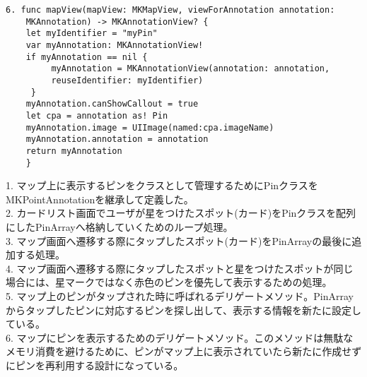\begin{description}
\begin{lstlisting}[basicstyle=\ttfamily\footnotesize, frame=single]
6. func mapView(mapView: MKMapView, viewForAnnotation annotation: 
    MKAnnotation) -> MKAnnotationView? {
    let myIdentifier = "myPin"
    var myAnnotation: MKAnnotationView!
    if myAnnotation == nil {
         myAnnotation = MKAnnotationView(annotation: annotation,
         reuseIdentifier: myIdentifier)
     }
    myAnnotation.canShowCallout = true
    let cpa = annotation as! Pin
    myAnnotation.image = UIImage(named:cpa.imageName)
    myAnnotation.annotation = annotation
    return myAnnotation
    }

 \end{lstlisting}

1. マップ上に表示するピンをクラスとして管理するためにPinクラスをMKPointAnnotationを継承して定義した。\\
2. カードリスト画面でユーザが星をつけたスポット(カード)をPinクラスを配列にしたPinArrayへ格納していくためのループ処理。\\
3. マップ画面へ遷移する際にタップしたスポット(カード)をPinArrayの最後に追加する処理。\\
4. マップ画面へ遷移する際にタップしたスポットと星をつけたスポットが同じ場合には、星マークではなく赤色のピンを優先して表示するための処理。\\
5. マップ上のピンがタップされた時に呼ばれるデリゲートメソッド。PinArrayからタップしたピンに対応するピンを探し出して、表示する情報を新たに設定している。\\
6. マップにピンを表示するためのデリゲートメソッド。このメソッドは無駄なメモリ消費を避けるために、ピンがマップ上に表示されていたら新たに作成せずにピンを再利用する設計になっている。\\
\end{description}
